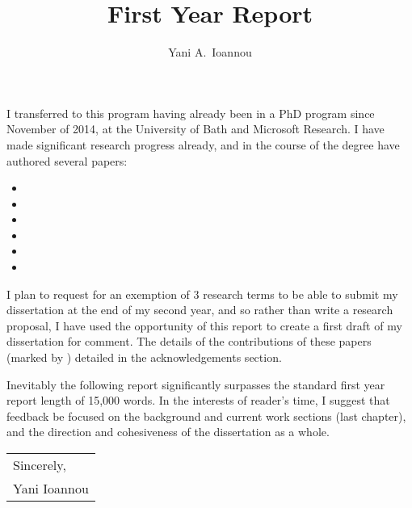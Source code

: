 \documentclass{article}
\begin{document}

\title{First Year Report}
\author{Yani A.~Ioannou}
\maketitle
\thispagestyle{empty}

I transferred to this program having already been in a PhD program since November of 2014, at the University of Bath and Microsoft Research. I have made significant research progress already, and in the course of the degree have authored several papers: 

\begin{itemize}
\footnotesize
    \item {}
	\item \footnotemark[1]
	\item \footnotemark[1]
	\item {}
	\item \footnotemark[1]
	\item {}
\end{itemize}

I plan to request for an exemption of 3 research terms to be able to submit my dissertation at the end of my second year, and so rather than write a research proposal, I have used the opportunity of this report to create a first draft of my dissertation for comment. The details of the contributions of these papers (marked by \footnotemark[1]) detailed in the acknowledgements section.

Inevitably the following report significantly surpasses the standard first year report length of 15,000 words. In the interests of reader's time, I suggest that feedback be focused on the background and current work sections (last chapter), and the direction and cohesiveness of the dissertation as a whole.


\null\hfill
\begin{tabular}{l@{}}
  Sincerely, \\[1\normalbaselineskip]
  Yani Ioannou
\end{tabular}
\end{document}
